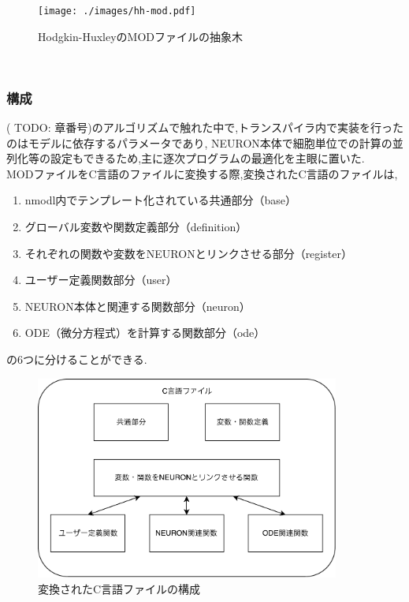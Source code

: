 \begin{figure}[htb]
  \begin{center}
    \texttt{[image: ./images/hh-mod.pdf]}
    \caption{Hodgkin-HuxleyのMODファイルの抽象木}
    \label{fig:hh-mod-ast}
  \end{center}
\end{figure}~\\
\clearpage

\subsubsection{構成}
( TODO: 章番号)のアルゴリズムで触れた中で,トランスパイラ内で実装を行ったのはモデルに依存するパラメータであり,
NEURON本体で細胞単位での計算の並列化等の設定もできるため,主に逐次プログラムの最適化を主眼に置いた.\\

MODファイルをC言語のファイルに変換する際,変換されたC言語のファイルは,\\
\begin{enumerate}
\item nmodl内でテンプレート化されている共通部分（base）
\item グローバル変数や関数定義部分（definition）
\item それぞれの関数や変数をNEURONとリンクさせる部分（register）
\item ユーザー定義関数部分（user）
\item NEURON本体と関連する関数部分（neuron）
\item ODE（微分方程式）を計算する関数部分（ode）
\end{enumerate}
の6つに分けることができる.\\

\begin{figure}[htb]
  \begin{center}
    \includegraphics[width=10.0cm]{./images/transpiler-c-file.pdf}
    \caption{変換されたC言語ファイルの構成}
    \label{fig:transpiler}
  \end{center}
\end{figure}~\\


